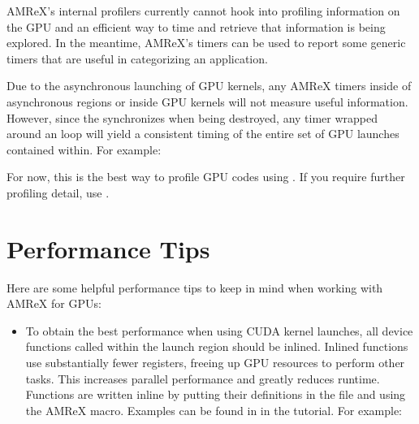 \documentclass[letterpaper,10pt,english]{sphinxmanual}
\begin{document}
\sphinxAtStartPar
AMReX’s internal profilers currently cannot hook into profiling information
on the GPU and an efficient way to time and retrieve that information is
being explored. In the meantime, AMReX’s timers can be used to report some
generic timers that are useful in categorizing an application.

\sphinxAtStartPar
Due to the asynchronous launching of GPU kernels, any AMReX timers inside of
asynchronous regions or inside GPU kernels will not measure useful
information.  However, since the  synchronizes when being
destroyed, any timer wrapped around an  loop will yield a
consistent timing of the entire set of GPU launches contained within. For
example:

\begin{sphinxVerbatim}[commandchars=\\\{\}]
      
    
              
\end{sphinxVerbatim}

\sphinxAtStartPar
For now, this is the best way to profile GPU codes using .
If you require further profiling detail, use .


\section{Performance Tips}
\label{\detokenize{GPU:performance-tips}}\label{\detokenize{GPU:sec-gpu-performance}}
\sphinxAtStartPar
Here are some helpful performance tips to keep in mind when working with
AMReX for GPUs:
\begin{itemize}
\item {} 
\sphinxAtStartPar
To obtain the best performance when using CUDA kernel launches, all
device functions called within the launch region should be inlined.
Inlined functions use substantially fewer registers, freeing up GPU
resources to perform other tasks. This increases parallel
performance and greatly reduces runtime.  Functions are written
inline by putting their definitions in the  file and using
the  AMReX macro.  Examples can be found in
in the  tutorial. For example:

\end{itemize}
\end{document}
